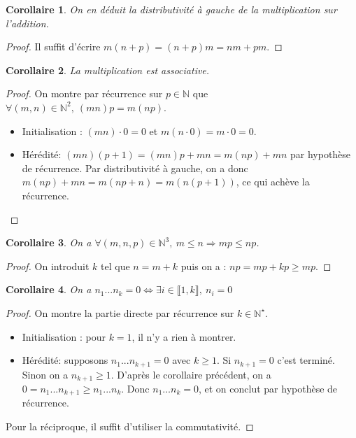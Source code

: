 \documentclass[french]{book}
\newcommand{\N}{\mathbb{N}}
\newcommand{\st}{^\star}
\theoremstyle{plain}
\newtheorem{cor}{Corollaire}[chapter]
\theoremstyle{definition}
\theoremstyle{remark}
\begin{document}
\begin{cor}
	On en déduit la distributivité à gauche de la multiplication sur l'addition.
\end{cor}
\begin{proof}
	Il suffit d'écrire $m(n+p) = (n+p)m = nm + pm$.
\end{proof}
\begin{cor}
	La multiplication est associative.
\end{cor}
\begin{proof}
	On montre par récurrence sur $p\in\mathbb{N}$ que $\forall(m,n)\in\mathbb{N}^{2},\ (mn)p=m(np)$.
\begin{itemize}
	\item Initialisation : $(mn)\cdot0=0$ et $m(n\cdot0)=m\cdot0=0$.
	\item Hérédité: $(mn)(p+1)=(mn)p+mn=m(np)+mn$ par hypothèse de récurrence. Par distributivité à gauche, on a donc $m(np)+mn=m(np+n)=m(n(p+1))$, ce qui achève la récurrence.
\end{itemize}
\end{proof}
\begin{cor}
	On a $\forall(m,n,p)\in\mathbb{N}^{3},\ m\leqslant n\Rightarrow mp\leqslant np$.
\end{cor}
\begin{proof}
	On introduit $k$ tel que $n=m+k$ puis on a : $np=mp+kp\geqslant mp$.
\end{proof}
\begin{cor}
	On a $n_{1}...n_{k}=0\iff\exists i\in\llbracket1,k\rrbracket,\ n_{i}=0$
\end{cor}
\begin{proof}
	On montre la partie directe par récurrence sur $k\in\N\st$.
\begin{itemize}
	\item Initialisation : pour $k=1$, il n'y a rien à montrer.
	\item Hérédité: supposons $n_{1}...n_{k+1}=0$ avec $k\geqslant1$. Si $n_{k+1}=0$ c'est terminé. Sinon on a $n_{k+1}\geqslant1$. D'après le corollaire précédent, on a $0=n_{1}...n_{k+1}\ge n_{1}...n_{k}$. Donc $n_{1}\ldots n_{k}=0$, et on conclut par hypothèse de récurrence.
\end{itemize}
Pour la réciproque, il suffit d'utiliser la commutativité.
\end{proof}
\end{document}
